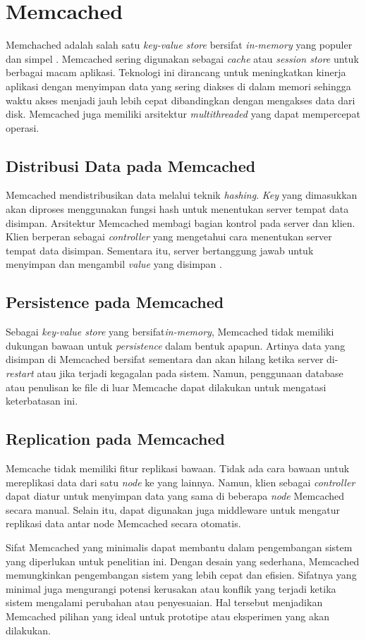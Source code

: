 \section{Memcached}

Memchached adalah salah satu \textit{key-value store} bersifat \textit{in-memory} yang populer dan simpel \parencite{nishtala2013scaling}. Memcached sering digunakan sebagai \textit{cache} atau \textit{session store} untuk berbagai macam aplikasi. Teknologi ini dirancang untuk meningkatkan kinerja aplikasi dengan menyimpan data yang sering diakses di dalam memori sehingga waktu akses menjadi jauh lebih cepat dibandingkan dengan mengakses data dari disk. Memcached juga memiliki arsitektur \textit{multithreaded} yang dapat mempercepat operasi.

\subsection{Distribusi Data pada Memcached}
Memcached mendistribusikan data melalui teknik \textit{hashing}. \textit{Key} yang dimasukkan akan diproses menggunakan fungsi hash untuk menentukan server tempat data disimpan. Arsitektur Memcached membagi bagian kontrol pada server dan klien. Klien berperan sebagai \textit{controller} yang mengetahui cara menentukan server tempat data disimpan. Sementara itu, server bertanggung jawab untuk menyimpan dan mengambil \textit{value} yang disimpan \parencite{memcached_documentation}.

\subsection{Persistence pada Memcached}
Sebagai \textit{key-value store} yang bersifat\textit{in-memory}, Memcached tidak memiliki dukungan bawaan untuk \textit{persistence} dalam bentuk apapun. Artinya data yang disimpan di Memcached bersifat sementara dan akan hilang ketika server di-\textit{restart} atau jika terjadi kegagalan pada sistem. Namun, penggunaan database atau penulisan ke file di luar Memcache dapat dilakukan untuk mengatasi keterbatasan ini.

\subsection{Replication pada Memcached}
Memcache tidak memiliki fitur replikasi bawaan. Tidak ada cara bawaan untuk mereplikasi data dari satu \textit{node} ke yang lainnya. Namun, klien sebagai \textit{controller} dapat diatur untuk menyimpan data yang sama di beberapa \textit{node} Memcached secara manual. Selain itu, dapat digunakan juga middleware untuk mengatur replikasi data antar node Memcached secara otomatis.

Sifat Memcached yang minimalis dapat membantu dalam pengembangan sistem yang diperlukan untuk penelitian ini. Dengan desain yang sederhana, Memcached memungkinkan pengembangan sistem yang lebih cepat dan efisien. Sifatnya yang minimal juga mengurangi potensi kerusakan atau konflik yang terjadi ketika sistem mengalami perubahan atau penyesuaian. Hal tersebut menjadikan Memcached pilihan yang ideal untuk prototipe atau eksperimen yang akan dilakukan.
